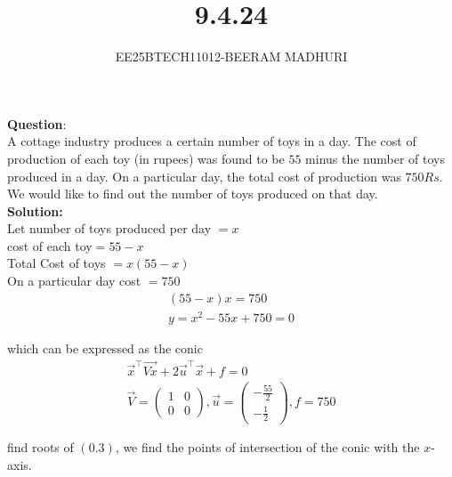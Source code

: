 \documentclass[journal]{IEEEtran}
\begin{document}

\vspace{3cm}

\title{9.4.24}
\author{EE25BTECH11012-BEERAM MADHURI}
{\let\newpage\relax\maketitle}

\renewcommand{\thefigure}{\theenumi}
\renewcommand{\thetable}{\theenumi}
\setlength{\intextsep}{10pt} %


\renewcommand{\thetable}{\theenumi}


\textbf{Question}:\\
A cottage industry produces a certain number of toys in a day. The cost of production of each toy (in rupees) was found to be $55$ minus the number of toys produced in a day. On a particular day, the total cost of production was $750Rs$. We would like to find out the number of toys produced on that day.\\
\textbf{Solution:}\\
Let number of toys produced per day $= x$ \\
cost of each toy$= 55-x$ \\
Total Cost of toys $= x(55-x)$ \\

On a particular day cost $= 750$ 
\begin{align}
(55-x) x = 750 \\
y=x^2 - 55x + 750 = 0
\end{align}

which can be expressed as the conic
\begin{align}
\vec{x}^\top \vec{V x} + 2 \vec{u}^\top \vec{x} + f = 0\\
\vec{V} = \begin{pmatrix} 1 & 0 \\ 0 & 0 \end{pmatrix}, \vec{u} = \begin{pmatrix} -\frac{55}{2} \\ -\frac{1}{2} \end{pmatrix}, f = 750
\end{align}

find roots of $(0.3)$, we find the points of intersection of the conic with the $x$-axis.
\end{document}
